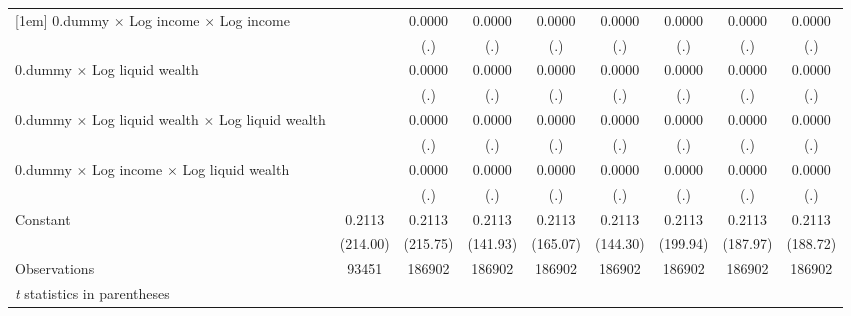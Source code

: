 \begin{table}[htbp]
\begin{tabular}{l*{8}{c}}
[1em]
0.dummy $\times$ Log income $\times$ Log income&            &      0.0000&      0.0000&      0.0000&      0.0000&      0.0000&      0.0000&      0.0000\\
                    &            &         (.)&         (.)&         (.)&         (.)&         (.)&         (.)&         (.)\\
[1em]
0.dummy $\times$ Log liquid wealth&            &      0.0000&      0.0000&      0.0000&      0.0000&      0.0000&      0.0000&      0.0000\\
                    &            &         (.)&         (.)&         (.)&         (.)&         (.)&         (.)&         (.)\\
[1em]
0.dummy $\times$ Log liquid wealth $\times$ Log liquid wealth&            &      0.0000&      0.0000&      0.0000&      0.0000&      0.0000&      0.0000&      0.0000\\
                    &            &         (.)&         (.)&         (.)&         (.)&         (.)&         (.)&         (.)\\
[1em]
0.dummy $\times$ Log income $\times$ Log liquid wealth&            &      0.0000&      0.0000&      0.0000&      0.0000&      0.0000&      0.0000&      0.0000\\
                    &            &         (.)&         (.)&         (.)&         (.)&         (.)&         (.)&         (.)\\
[1em]
Constant            &      0.2113&      0.2113&      0.2113&      0.2113&      0.2113&      0.2113&      0.2113&      0.2113\\
                    &    (214.00)&    (215.75)&    (141.93)&    (165.07)&    (144.30)&    (199.94)&    (187.97)&    (188.72)\\
\hline
Observations        &       93451&      186902&      186902&      186902&      186902&      186902&      186902&      186902\\
\hline\hline
\multicolumn{9}{l}{\footnotesize \textit{t} statistics in parentheses}\\
\end{tabular}
\end{table}
